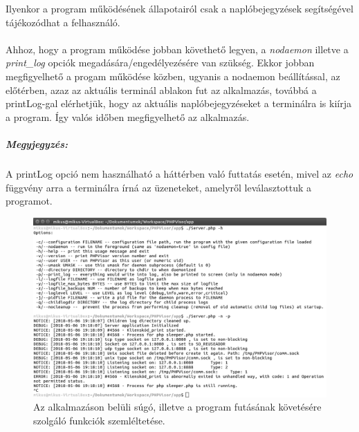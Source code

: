 \documentclass[12pt]{report}
\begin{document}
  Ilyenkor a program működésének állapotairól csak a naplóbejegyzések segítségével tájékozódhat a felhasználó. 
  \paragraph{}
  Ahhoz, hogy a program működése jobban követhető legyen, a \textit{nodaemon} illetve a \textit{print\_log} opciók megadására/engedélyezésére van szükség. Ekkor jobban megfigyelhető a progam működése közben, ugyanis a nodaemon beállítással, az előtérben, azaz az aktuális terminál ablakon fut az alkalmazás, továbbá a printLog-gal elérhetjük, hogy az  aktuális naplóbejegyzéseket a terminálra is kiírja a program.
Így valós időben megfigyelhető az alkalmazás.
\subparagraph{Megyjegyzés:}
A printLog opció nem használható a háttérben való futtatás esetén, mivel az \textit{echo} függvény arra a terminálra írná az üzeneteket, amelyről leválasztottuk a programot.

  \begin{figure}[ht]
  \centering
  \includegraphics[width=14cm]{pics/run_print.png}
	  \caption{Az alkalmazáson belüli súgó, illetve  a program futásának követésére szolgáló funkciók szemléltetése.\newline}
      \label{fig:run_print}
  \end{figure}
\end{document}
